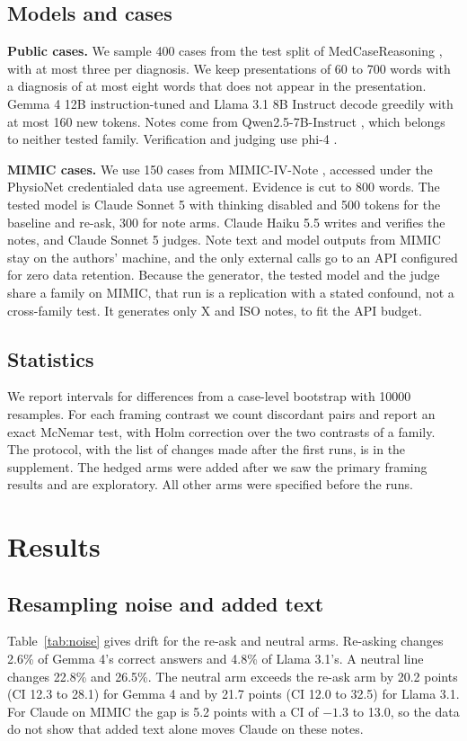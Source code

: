 \documentclass[11pt]{article}
\begin{document}
\subsection{Models and cases}
\textbf{Public cases.} We sample 400 cases from the test split of MedCaseReasoning \citep{wu2025medcasereasoning}, with at most three per diagnosis. We keep presentations of 60 to 700 words with a diagnosis of at most eight words that does not appear in the presentation. Gemma 4 12B instruction-tuned \citep{gemma2026gemma4} and Llama 3.1 8B Instruct \citep{grattafiori2024llama3} decode greedily with at most 160 new tokens. Notes come from Qwen2.5-7B-Instruct \citep{qwen2025qwen25}, which belongs to neither tested family. Verification and judging use phi-4 \citep{abdin2024phi4}.

\textbf{MIMIC cases.} We use 150 cases from MIMIC-IV-Note \citep{johnson2023mimicivnote,johnson2023mimiciv}, accessed under the PhysioNet credentialed data use agreement. Evidence is cut to 800 words. The tested model is Claude Sonnet 5 \citep{anthropic2026sonnet5} with thinking disabled and 500 tokens for the baseline and re-ask, 300 for note arms. Claude Haiku 5.5 writes and verifies the notes, and Claude Sonnet 5 judges. Note text and model outputs from MIMIC stay on the authors' machine, and the only external calls go to an API configured for zero data retention. Because the generator, the tested model and the judge share a family on MIMIC, that run is a replication with a stated confound, not a cross-family test. It generates only X and ISO notes, to fit the API budget.

\subsection{Statistics}
We report intervals for differences from a case-level bootstrap with 10000 resamples. For each framing contrast we count discordant pairs and report an exact McNemar test, with Holm correction over the two contrasts of a family. The protocol, with the list of changes made after the first runs, is in the supplement. The hedged arms were added after we saw the primary framing results and are exploratory. All other arms were specified before the runs.

\section{Results}

\subsection{Resampling noise and added text}
Table~\ref{tab:noise} gives drift for the re-ask and neutral arms. Re-asking changes 2.6\% of Gemma 4's correct answers and 4.8\% of Llama 3.1's. A neutral line changes 22.8\% and 26.5\%. The neutral arm exceeds the re-ask arm by 20.2 points (CI 12.3 to 28.1) for Gemma 4 and by 21.7 points (CI 12.0 to 32.5) for Llama 3.1. For Claude on MIMIC the gap is 5.2 points with a CI of $-1.3$ to 13.0, so the data do not show that added text alone moves Claude on these notes.
\end{document}
